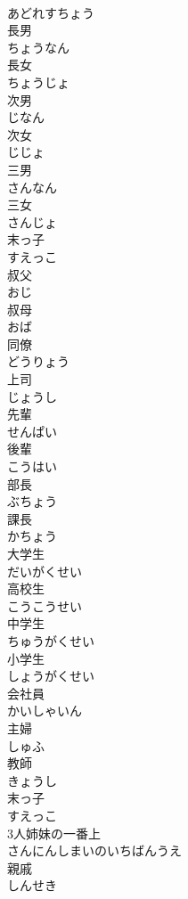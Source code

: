 \documentclass[8pt]{extreport}
\begin{document}
\begin{CJK}{UTF8}{min}
\\	あどれすちょう
\\	長男	
\\	ちょうなん
\\	長女	
\\	ちょうじょ
\\	次男	
\\	じなん
\\	次女	
\\	じじょ
\\	三男	
\\	さんなん
\\	三女	
\\	さんじょ
\\	末っ子	
\\	すえっこ
\\	叔父	
\\	おじ
\\	叔母	
\\	おば
\\	同僚	
\\	どうりょう
\\	上司	
\\	じょうし
\\	先輩	
\\	せんぱい
\\	後輩	
\\	こうはい
\\	部長	
\\	ぶちょう
\\	課長	
\\	かちょう
\\	大学生	
\\	だいがくせい
\\	高校生	
\\	こうこうせい
\\	中学生	
\\	ちゅうがくせい
\\	小学生	
\\	しょうがくせい
\\	会社員	
\\	かいしゃいん
\\	主婦	
\\	しゅふ
\\	教師	
\\	きょうし
\\	末っ子	
\\	すえっこ
\\	3人姉妹の一番上	
\\	さんにんしまいのいちばんうえ
\\	親戚	
\\	しんせき

\end{CJK}
\end{document}
